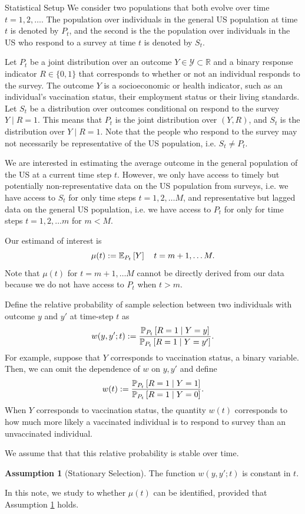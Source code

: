 \documentclass{article}
\theoremstyle{definition}
\newtheorem{assumption}{Assumption}
\theoremstyle{plain}
\theoremstyle{remark}
\begin{document}
\begin{section}{Statistical Setup}
We consider two populations that both evolve over time $t=1, 2, \dots$. The population over individuals in the general US population at time $t$ is denoted by $P_{t}$, and the second is the the population over individuals in the US who respond to a survey at time $t$ is denoted by $S_{t}$. 

Let $P_{t}$ be a joint distribution over an outcome $Y \in \mathcal{Y} \subset \mathbb{R}$ and a binary response indicator $R \in \{0, 1\}$ that corresponds to whether or not an individual responds to the survey. The outcome $Y$ is a socioeconomic or health indicator, such as an individual's vaccination status, their employment status or their living standards. Let $S_{t}$ be a distribution over outcomes conditional on respond to the survey $Y \mid R=1.$ This means that $P_{t}$ is the joint distribution over $(Y, R)$, and $S_{t}$ is the distribution over $Y \mid R=1$. Note that the people who respond to the survey may not necessarily be representative of the US population, i.e. $S_{t} \neq P_{t}$.

We are interested in estimating the average outcome in the general population of the US at a current time step $t$. However, we only have access to timely but potentially non-representative data on the US population from surveys, i.e. we have access to $S_{t}$ for only time steps $t=1, 2, \dots M$, and representative but lagged data on the general US population, i.e. we have access to $P_{t}$ for only for time steps $t=1, 2, \dots m$ for $m < M$. 

Our estimand of interest is 
\[\mu(t) := \EE[P_{t}]{Y} \quad t = m+1, \dots M.\] Note that $\mu(t)$ for $t = m+1, \dots M$ cannot be directly derived from our data because we do not have access to $P_{t}$ when $t > m$. 

Define the relative probability of sample selection between two individuals with outcome $y$ and $y'$ at time-step $t$ as 
\begin{equation} w(y, y'; t) := \frac{\PP[P_{t}]{R=1 \mid Y=y}}{\PP[P_{t}]{R=1 \mid Y= y'}}.\end{equation}
For example, suppose that  $Y$ corresponds to vaccination status, a binary variable. Then, we can omit the dependence of $w$ on $y, y'$ and define \[ w(t):= \frac{\PP[P_{t}]{R = 1\mid Y=1}}{\PP[P_{t}]{R=1 \mid Y=0}}.\] When $Y$ corresponds to vaccination status, the quantity $w(t)$ corresponds to how much more likely a vaccinated individual is to respond to survey than an unvaccinated individual.

We assume that that this relative probability is stable over time.
\begin{assumption}[Stationary Selection]
\label{assumption:stationary_selection}
The function $w(y, y'; t)$ is constant in $t$.
\end{assumption}
In this note, we study to whether $\mu(t)$ can be identified, provided that Assumption \ref{assumption:stationary_selection} holds.
\end{section}
\end{document}
